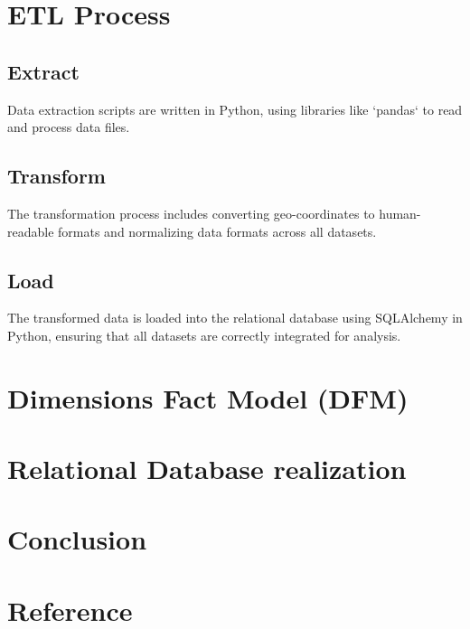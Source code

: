 \documentclass[conference]{IEEEtran}
\begin{document}
	\section{ETL Process}
	
	\subsection{Extract}
	Data extraction scripts are written in Python, using libraries like `pandas` to read and process data files.
	
	\subsection{Transform}
	The transformation process includes converting geo-coordinates to human-readable formats and normalizing data formats across all datasets.
	
	\subsection{Load}
	The transformed data is loaded into the relational database using SQLAlchemy in Python, ensuring that all datasets are correctly integrated for analysis.
	
	\section{Dimensions Fact Model (DFM)}
	
	\section{Relational Database realization}

	\section{Conclusion}
	
	\section{Reference}
	
	
	
	
	
\end{document}
